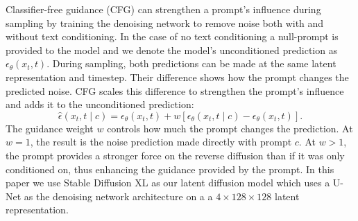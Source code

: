 \documentclass{article} %
\begin{document}
Classifier-free guidance (CFG) can strengthen a prompt's influence during
sampling \citep{ho2022classifier} by training the denoising network to remove noise both with and without text conditioning. In the case of no text conditioning a null-prompt is provided to the model and we denote the model's unconditioned prediction as $\epsilon_\theta(x_t,t)$. During sampling, both predictions can be made at the same latent representation and
timestep. Their difference shows how the prompt changes the predicted
noise. CFG scales this difference to strengthen the prompt's influence and adds it to the unconditioned prediction:
\begin{equation}
\hat\epsilon(x_t,t\mid c)
=
\epsilon_\theta(x_t,t)
+w\left[
\epsilon_\theta(x_t,t\mid c)-\epsilon_\theta(x_t,t)
\right].
\label{eq:cfg}
\end{equation}
The guidance weight $w$ controls how much the prompt changes the
prediction. At $w=1$, the result is the noise prediction made directly with
prompt $c$. At $w>1$, the prompt provides a stronger force on the reverse diffusion than if it was only conditioned on, thus enhancing the guidance provided by the prompt. In this paper we use Stable Diffusion XL \citep{podell2023sdxl} as our latent diffusion model \citep{rombach2022high} which uses a U-Net as the denoising network architecture \citep{ronneberger2015u} on a a $4 \times 128 \times 128$ latent representation.




\end{document}
